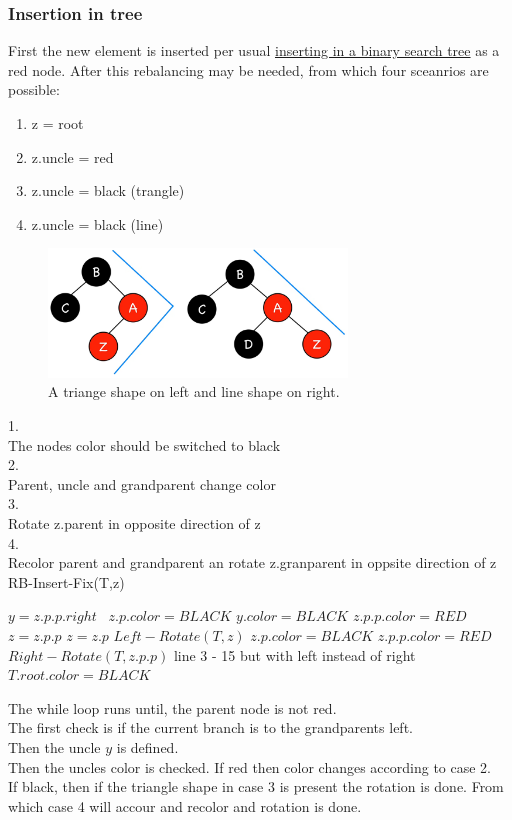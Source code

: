 \documentclass[12pt, a4paper]{article}
\begin{document}
			\subsubsection{Insertion in tree}
				First the new element is inserted per usual \hyperref[sec:BSTInsert]{inserting in a binary search tree} as a red node.
				After this rebalancing may be needed, from which four sceanrios are possible:
				\begin{enumerate}
					\item z = root
					\item z.uncle = red
					\item z.uncle = black (trangle)
					\item z.uncle = black (line)
				\end{enumerate}
				\begin{figure}[h!]
					\center
					\includegraphics[width=300px]{assets/blackRedTreeTriangeLine.png}
					\caption{A triange shape on left and line shape on right.}
				\end{figure}
				1.\\
				The nodes color should be switched to black\\
				2.\\
				Parent, uncle and grandparent change color\\
				3.\\
				Rotate z.parent in opposite direction of z\\
				4.\\
				Recolor parent and grandparent an rotate z.granparent in oppsite direction of z\\
				RB-Insert-Fix(T,z)
				\begin{algorithmic}[1]
							\State $y = z.p.p.right$\
								\State $z.p.color = BLACK$
								\State $y.color = BLACK$
								\State $z.p.p.color = RED$
								\State $z = z.p.p$
							\Else
									\State $z = z.p$
									\State $Left-Rotate(T,z)$
								\EndIf
								\State $z.p.color = BLACK$
								\State $z.p.p.color = RED$
								\State $Right-Rotate(T,z.p.p)$
							\EndIf
						\Else
							\State line 3 - 15 but with left instead of right
						\EndIf
					\EndWhile	
					\State $T.root.color = BLACK$
				\end{algorithmic}
				The while loop runs until, the parent node is not red.\\
				The first check is if the current branch is to the grandparents left.\\
				Then the uncle $y$ is defined.\\
				Then the uncles color is checked. If red then color changes according to case 2.\\
				If black, then if the triangle shape in case 3 is present the rotation is done. From which case 4 will accour and recolor and rotation is done.
\end{document}
